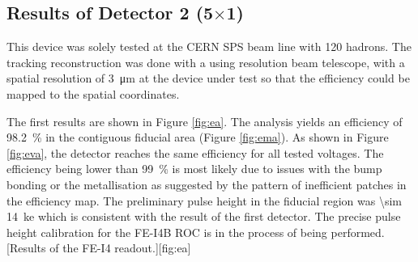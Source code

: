 \subsection{Results of Detector 2 (5$\times$1)}
This device was solely tested at the CERN SPS beam line with \SI{120}{\gev} hadrons. The tracking reconstruction was done with a using resolution beam telescope, with a spatial resolution of \SI{3}{\micro\meter} at the device under test so that the efficiency could be mapped to the spatial coordinates. \par
The first results are shown in Figure \ref{fig:ea}. The analysis yields an efficiency of \SI{98.2}{\%} in the contiguous fiducial area (Figure \ref{fig:ema}). As shown in Figure \ref{fig:eva}, the detector reaches the same efficiency for all tested voltages. The efficiency being lower than \SI{99}{\%} is most likely due to issues with the bump bonding or the metallisation as suggested by the pattern of inefficient patches in the efficiency map. The preliminary pulse height in the fiducial region was \SI{\sim 14}{\kilo e} which is consistent with the result of the first detector. The precise pulse height calibration for the FE-I4B \ac{ROC} is in the process of being performed.
[Results of the FE-I4 readout.][fig:ea]